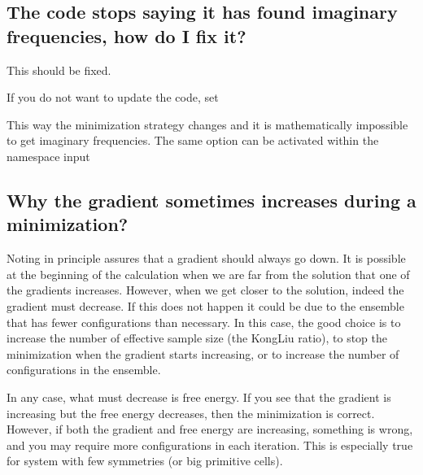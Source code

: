 \documentclass[a4paper,11pt,english]{sphinxmanual}
\begin{document}
\subsection{The code stops saying it has found imaginary frequencies, how do I fix it?}
\label{\detokenize{faq:the-code-stops-saying-it-has-found-imaginary-frequencies-how-do-i-fix-it}}
\sphinxAtStartPar
{} This should be fixed.

\sphinxAtStartPar
If you do not want to update the code, set

\begin{sphinxVerbatim}[commandchars=\\\{\}]
  
\end{sphinxVerbatim}

\sphinxAtStartPar
This way the minimization strategy changes and it is mathematically impossible to get imaginary frequencies.
The same option can be activated within the namespace input

\begin{sphinxVerbatim}[commandchars=\\\{\}]
\end{sphinxVerbatim}


\subsection{Why the gradient sometimes increases during a minimization?}
\label{\detokenize{faq:why-the-gradient-sometimes-increases-during-a-minimization}}
\sphinxAtStartPar
Noting in principle assures that a gradient should always go down. It is possible at the beginning of the calculation when we are far from the solution that one of the gradients increases.
However, when we get closer to the solution, indeed the gradient must decrease.
If this does not happen it could be due to the ensemble that has fewer configurations than necessary. In this case, the good choice is to increase the number of effective sample size (the Kong\sphinxhyphen{}Liu ratio), to stop the minimization when the gradient starts increasing, or to increase the number of configurations in the ensemble.

\sphinxAtStartPar
In any case, what must decrease is free energy. If you see that the gradient is increasing but the free energy decreases, then the minimization is correct. However, if both the gradient and free energy are increasing, something is wrong, and you may require more configurations in each iteration.
This is especially true for system with few symmetries (or big primitive cells).
\end{document}
